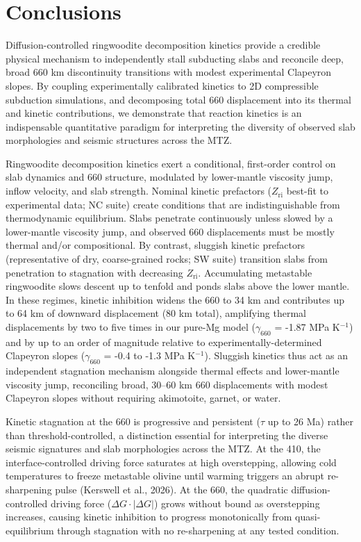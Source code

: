 \documentclass[draft,linenumbers]{agujournal2019}
\begin{document}
\section{Conclusions}\label{sec:conclusions}

Diffusion-controlled ringwoodite decomposition kinetics provide a
credible physical mechanism to independently stall subducting slabs and
reconcile deep, broad 660 km discontinuity transitions with modest
experimental Clapeyron slopes. By coupling experimentally calibrated
kinetics to 2D compressible subduction simulations, and decomposing
total 660 displacement into its thermal and kinetic contributions, we
demonstrate that reaction kinetics is an indispensable quantitative
paradigm for interpreting the diversity of observed slab morphologies
and seismic structures across the MTZ.

Ringwoodite decomposition kinetics exert a conditional, first-order
control on slab dynamics and 660 structure, modulated by lower-mantle
viscosity jump, inflow velocity, and slab strength. Nominal kinetic
prefactors (\(Z_\mathrm{ri}\) best-fit to experimental data; NC suite)
create conditions that are indistinguishable from thermodynamic
equilibrium. Slabs penetrate continuously unless slowed by a
lower-mantle viscosity jump, and observed 660 displacements must be
mostly thermal and/or compositional. By contrast, sluggish kinetic
prefactors (representative of dry, coarse-grained rocks; SW suite)
transition slabs from penetration to stagnation with decreasing
\(Z_\mathrm{ri}\). Accumulating metastable ringwoodite slows descent up
to tenfold and ponds slabs above the lower mantle. In these regimes,
kinetic inhibition widens the 660 to 34 km and contributes up to 64 km
of downward displacement (80 km total), amplifying thermal displacements
by two to five times in our pure-Mg model (\(\gamma_{660}\) = -1.87 MPa
K\(^{-1}\)) and by up to an order of magnitude relative to
experimentally-determined Clapeyron slopes (\(\gamma_{660}\) = -0.4 to
-1.3 MPa K\(^{-1}\)). Sluggish kinetics thus act as an independent
stagnation mechanism alongside thermal effects and lower-mantle
viscosity jump, reconciling broad, 30--60 km 660 displacements with
modest Clapeyron slopes without requiring akimotoite, garnet, or water.

Kinetic stagnation at the 660 is progressive and persistent (\(\tau\) up
to 26 Ma) rather than threshold-controlled, a distinction essential for
interpreting the diverse seismic signatures and slab morphologies across
the MTZ. At the 410, the interface-controlled driving force saturates at
high overstepping, allowing cold temperatures to freeze metastable
olivine until warming triggers an abrupt re-sharpening pulse (Kerswell
et al., 2026). At the 660, the quadratic diffusion-controlled driving
force (\(\Delta G \cdot |\Delta G|\)) grows without bound as
overstepping increases, causing kinetic inhibition to progress
monotonically from quasi-equilibrium through stagnation with no
re-sharpening at any tested condition.
\end{document}
